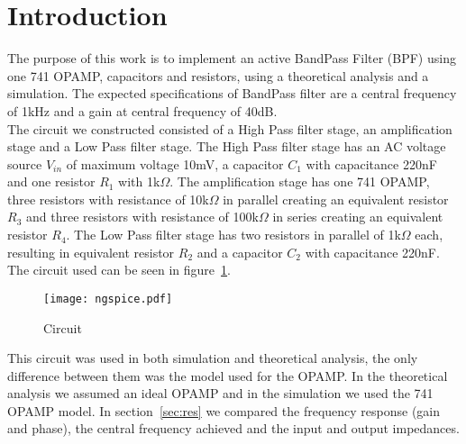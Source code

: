 \section{Introduction}
\label{sec:intro}
The purpose of this work is to implement an active BandPass Filter (BPF) using one 741 OPAMP, capacitors and resistors, using a theoretical analysis and a simulation. The expected specifications of BandPass filter are a central frequency of 1kHz and a gain at central frequency of 40dB.\\
The circuit we constructed consisted of a High Pass filter stage, an amplification stage and a Low Pass filter stage. The High Pass filter stage has an AC voltage source $V_{in}$ of maximum voltage 10mV, a capacitor $C_1$ with capacitance 220nF and one resistor $R_1$ with 1k$\Omega$. The amplification stage has one 741 OPAMP, three resistors with resistance of 10k$\Omega$ in parallel creating an equivalent resistor $R_3$ and three resistors with resistance of 100k$\Omega$ in series creating an equivalent resistor $R_4$. The Low Pass filter stage has two resistors in parallel of 1k$\Omega$ each, resulting in equivalent resistor $R_2$ and a capacitor $C_2$ with capacitance 220nF. The circuit used can be seen in figure~\ref{fig:circngspice}.
\begin{figure}[H] \centering
\texttt{[image: ngspice.pdf]}
\caption{Circuit}
\label{fig:circngspice}
\end{figure} 

This circuit was used in both simulation and theoretical analysis, the only difference between them was the model used for the OPAMP. In the theoretical analysis we assumed an ideal OPAMP and in the simulation we used the 741 OPAMP model. In section~\ref{sec:res} we compared the frequency response (gain and phase), the central frequency achieved and the input and output impedances. 
